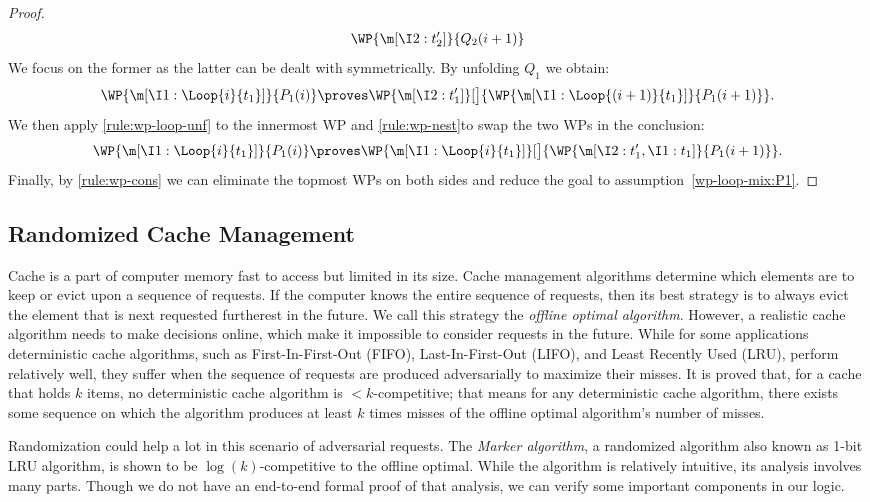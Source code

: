 \begin{proof}
\begin{align*}
    \WP{\m[\I2: t_2']}{Q_2(i+1)}
  \end{align*}
  We focus on the former as the latter can be dealt with symmetrically.
  By unfolding $Q_1$ we obtain:
  \[
    \WP{\m[\I1: \Loop{i}{t_1}]}{P_1(i)}
    \proves
    \WP{\m[\I2: t_1']}[\big]{\WP{\m[\I1: \Loop{(i+1)}{t_1}]}{P_1(i+1)}}.
  \]
  We then apply \ref{rule:wp-loop-unf} to the innermost WP and \ref{rule:wp-nest}to swap the two WPs in the conclusion:
  \[
    \WP{\m[\I1: \Loop{i}{t_1}]}{P_1(i)}
    \proves
    \WP{\m[\I1: \Loop{i}{t_1}]}[\big]{\WP{\m[\I2: t_1', \I1: t_1]}{P_1(i+1)}}.
  \]
  Finally, by \ref{rule:wp-cons} we can eliminate the topmost WPs
  on both sides and reduce the goal to assumption~\eqref{wp-loop-mix:P1}.
\end{proof}
 
 







\subsection{Randomized Cache Management}
  

Cache is a part of computer memory fast to access but limited in its size.
Cache management algorithms determine which elements are to keep or
evict upon a sequence of requests.
If the computer knows the entire sequence of requests, then its best strategy is
to always evict the element that is next requested furtherest in the future.
We call this strategy the \emph{offline optimal algorithm}.
However, a realistic cache algorithm needs to make decisions
online, which make it impossible to consider requests in the future.
While for some applications deterministic
cache algorithms, such as First-In-First-Out (FIFO), Last-In-First-Out (LIFO),
and Least Recently Used (LRU), perform relatively well, they suffer when the
sequence of requests are produced adversarially to maximize their misses. It is
proved that, for a cache that holds $k$ items, no deterministic cache algorithm
is $< k$-competitive; that means for any deterministic cache algorithm, there
exists some sequence on which the algorithm produces at least $k$ times misses
of the offline optimal algorithm's number of misses.

Randomization could help a lot in this scenario of adversarial requests.
The \emph{Marker algorithm}, a randomized algorithm also known as 1-bit LRU algorithm,
is shown to be $\log(k)$-competitive to the offline optimal.
While the algorithm is relatively intuitive, its analysis involves many parts.
Though we do not have an end-to-end formal proof of that analysis,
we can verify some important components in our logic.

